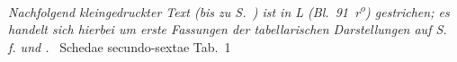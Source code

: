 %
\pend%
\newpage%
%
%
\pstart%
\noindent%
\lbrack\textit{Nachfolgend kleingedruckter Text (bis zu S.~\pageref{LH_37_05_091r_ende}) ist in L (Bl.~91~r\textsuperscript{o}\!) gestrichen; es handelt sich hierbei um erste Fassungen der tabellarischen Darstellungen auf S.~\pageref{LH_35_09_23_017v_tab1}\,f. und \pageref{LH_35_09_23_018r_tab2}.}\rbrack\
%
\pend%
\vspace{1.5em}%
%
\footnotesize%
%
\pstart%
\noindent%
\centering%
Schedae secundo-sextae Tab.~1%
\protect{}%
\protect{}%
\protect{}%
\protect{}%
\label{LH_37_05_091r_gestrtab}
\pend%
\vspace{0.5em}%
%
\pstart%
\noindent%
